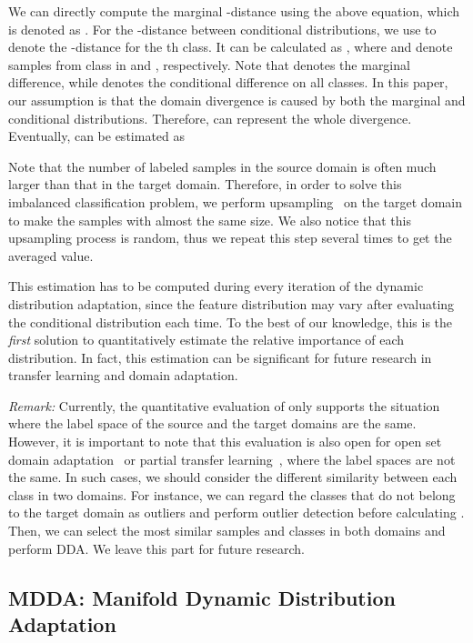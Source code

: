 \documentclass[acmsmall]{acmart}
\begin{document}
We can directly compute the marginal -distance using the above equation, which is denoted as . For the -distance between conditional distributions, we use  to denote the -distance for the th class. It can be calculated as , where  and  denote samples from class  in  and , respectively. Note that  denotes the marginal difference, while  denotes the conditional difference on all classes. In this paper, our assumption is that the domain divergence is caused by both the marginal and conditional distributions. Therefore,  can represent the whole divergence. Eventually,  can be estimated as



Note that the number of labeled samples in the source domain is often much larger than that in the target domain. Therefore, in order to solve this imbalanced classification problem, we perform upsampling~\cite{krawczyk2016learning} on the target domain to make the samples with almost the same size. We also notice that this upsampling process is random, thus we repeat this step several times to get the averaged  value.

This estimation has to be computed during every iteration of the dynamic distribution adaptation, since the feature distribution may vary after evaluating the conditional distribution each time. 
To the best of our knowledge, this is the \textit{first} solution to quantitatively estimate the relative importance of each distribution. In fact, this estimation can be significant for future research in transfer learning and domain adaptation.

\textit{Remark:} Currently, the quantitative evaluation of  only supports the situation where the label space of the source and the target domains are the same. However, it is important to note that this evaluation is also open for open set domain adaptation~\cite{panareda2017open} or partial transfer learning~\cite{zhang2018importance}, where the label spaces are not the same. In such cases, we should consider the different similarity between each class in two domains. For instance, we can regard the classes that do not belong to the target domain as outliers and perform outlier detection before calculating . Then, we can select the most similar samples and classes in both domains and perform DDA. We leave this part for future research.

\subsection{MDDA: Manifold Dynamic Distribution Adaptation}
\end{document}
